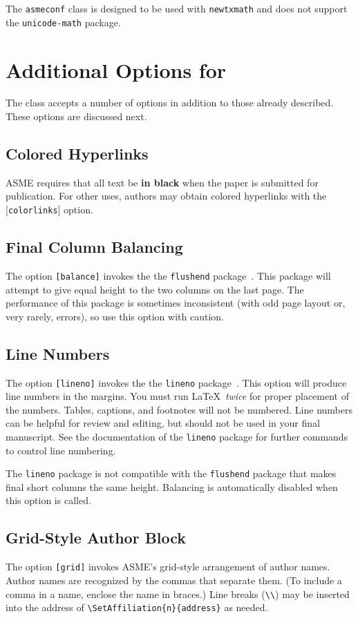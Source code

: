 \documentclass[captionpatch,colorlinks,upint,subscriptcorrection,varvw,german]{asmeconf}
\begin{document}
The \texttt{asmeconf} class is designed to be used with \texttt{newtxmath} and does not support the \texttt{unicode-math} package.



\section{Additional Options for }
The class accepts a number of options in addition to those already described. These options are discussed next.

\subsection{Colored Hyperlinks}
ASME requires that all text be \textbf{in black} when the paper is submitted for publication.  For other uses, authors may
obtain colored hyperlinks with the [\texttt{colorlinks}] option.

\subsection{Final Column Balancing} The option \texttt{[balance]} invokes the the \texttt{flushend} package~\cite{tolusis}.
This package will attempt to give equal height to the two columns on the last page. The performance of this package is sometimes inconsistent (with odd page layout or, very rarely, errors), so use this option with caution.

\subsection{Line Numbers} The option \texttt{[lineno]} invokes the the \texttt{lineno} package~\cite{bottcher}. This option will produce line numbers in the margins. You must run \LaTeX\ \textit{twice} for proper placement of the numbers. Tables, captions, and footnotes will not be numbered.  Line numbers can be helpful for review and editing, but should not be used in your final manuscript. See the documentation of the \texttt{lineno} package for further commands to control line numbering. 

The \texttt{lineno} package is not compatible with the \texttt{flushend} package that makes final short columns the same height. Balancing is automatically disabled when this option is called. 

\subsection{Grid-Style Author Block} The option \texttt{[grid]} invokes ASME's grid-style arrangement of author names. Author names are recognized by the commas that separate them. (To include a comma in a name, enclose the name in braces.) Line breaks (\verb|\\|) may be inserted into the address of \verb|\SetAffiliation{n}{address}| as needed. 
\end{document}
